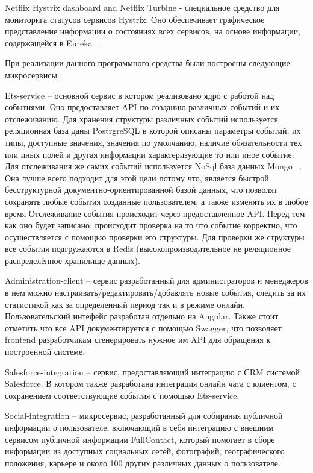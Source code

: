 Netflix Hystrix dashboard and Netflix Turbine - специальное средство для мониторига статусов сервисов Hystrix. Оно обеспечивает графическое представление информации о состояниях всех сервисов, на основе информации, содержащейся в Eureka ~\cite{hystrix}. 

При реализации данного программного средства были построены следующие микросервисы:

Ets-service -- основной сервис в котором реализовано ядро с работой над событиями. Оно предоставляет API по созданию различных событий и их отслеживанию. 
Для хранения структуры различных событий используется реляционная база даны PostrgreSQL в которой описаны параметры событий, их типы, доступные значения, значения по умолчанию, наличие обязательности тех или иных полей и другая информации характеризующие то или иное событие.
Для отслеживания же самих событий используется NoSql база данных Mongo ~\cite{mongo}. Она лучше всего подходит для этой цели потому что, является быстрой бесструктурной документно-ориентированной базой данных, что позволят сохранять любые события созданные пользователем, а также изменять их в любое время
Отслеживание события происходит через предоставленное API. Перед тем как оно будет записано, происходит проверка на то что событие корректно, что осуществляется с помощью проверки его структуры. Для проверки же структуры все события подгружаются в Redis (высокопроизводительное не реляционное распределённое хранилище данных).


Administration-client -- сервис разработанный для администраторов и менеджеров в нем можно настраивать/редактировать/добавлять новые события, следить за их статистикой как за определенный период так и в режиме онлайн. 
Пользовательский интефейс разработан отдельно на Angular. 
Также стоит отметить что все API документируется с помощью Swagger, что позволяет frontend разработчикам сгенерировать нужное им API для обращения к построенной системе.


Salesforce-integration -- сервис, предоставляющий интеграцию с СRM системой Salesforce. В  котором также разработана интеграция  онлайн чата с клиентом, с сохранением соответствующие  события с помощью Ets-service.


Social-integration -- микросервис, разработанный для собирания публичной информации о пользователе, включающий в себя интеграцию с внешним сервисом публичной информации FullContact, который помогает в сборе информации из доступных социальных сетей, фотографий, географического положения, карьере и около 100 других различных данных о пользователе.


